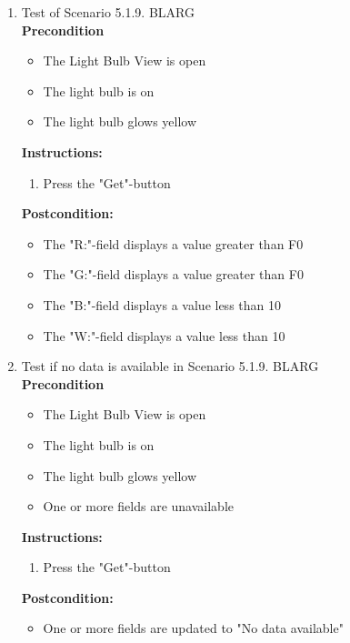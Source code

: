 \documentclass[a4paper]{article}
\newlength{\testlabellength}
\newenvironment{testlist}{\begin{enumerate}[label=\bfseries Instruction \thesubsection.\arabic* , labelindent=0pt, labelwidth=\testlabellength , leftmargin=2cm]}{\end{enumerate}}
\newenvironment{precondition}{
{\color{white}BLARG}\\ 
\textbf{Precondition}
\begin{itemize}[labelindent=0cm, labelwidth=2cm , leftmargin=1cm]
}
{\end{itemize}}
\newenvironment{instruction}{
\textbf{Instructions:}
\begin{enumerate}[label=\bfseries  \arabic*., labelindent=0cm, labelwidth=2cm , leftmargin=1cm]
}
{\end{enumerate}}
\newenvironment{postcondition}{
\textbf{Postcondition:}
\begin{itemize}[labelindent=0cm, labelwidth=2cm , leftmargin=1cm]
}
{\end{itemize}}
\begin{document}
\begin{appendices}
\begin{testlist}
	\item  Test of Scenario 5.1.9.
		\begin{precondition}
			\item The Light Bulb View is open
			\item The light bulb is on
			\item The light bulb glows yellow
		\end{precondition}
		\begin{instruction}
			\item Press the "Get"-button
		\end{instruction}
		\begin{postcondition}
			\item The "R:"-field displays a value greater than F0
			\item The "G:"-field displays a value greater than F0
			\item The "B:"-field displays a value less than 10
			\item The "W:"-field displays a value less than 10
		\end{postcondition}
\newpage
	\item  Test if no data is available in Scenario 5.1.9.
		\begin{precondition}
			\item The Light Bulb View is open
			\item The light bulb is on
			\item The light bulb glows yellow
			\item One or more fields are unavailable
		\end{precondition}
		\begin{instruction}
			\item Press the "Get"-button
		\end{instruction}
		\begin{postcondition}
			\item One or more fields are updated to "No data available"
		\end{postcondition}


\end{testlist}
\end{appendices}
\end{document}
